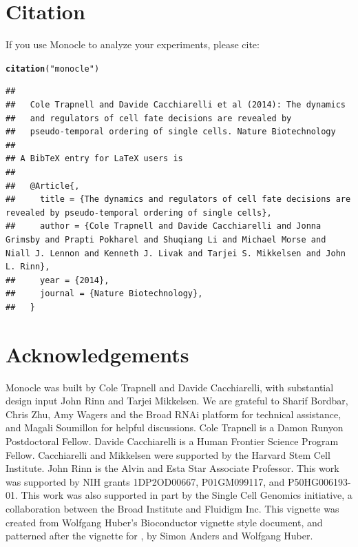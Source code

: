 \documentclass[10pt,oneside]{article}\usepackage[]{graphicx}\usepackage[]{color}
\makeatletter
\newcommand{\hlstr}[1]{\textcolor[rgb]{0.192,0.494,0.8}{#1}}%
\newcommand{\hlstd}[1]{\textcolor[rgb]{0.345,0.345,0.345}{#1}}%
\newcommand{\hlkwd}[1]{\textcolor[rgb]{0.737,0.353,0.396}{\textbf{#1}}}%
\newenvironment{kframe}{%
 \def\at@end@of@kframe{}%
 \ifinner\ifhmode%
  \def\at@end@of@kframe{\end{minipage}}%
  \begin{minipage}{\columnwidth}%
 \fi\fi%
 \def\FrameCommand##1{\hskip\@totalleftmargin \hskip-\fboxsep
 \colorbox{shadecolor}{##1}\hskip-\fboxsep
     \hskip-\linewidth \hskip-\@totalleftmargin \hskip\columnwidth}%
 \MakeFramed {\advance\hsize-\width
   \@totalleftmargin\z@ \linewidth\hsize
   \@setminipage}}%
 {\par\unskip\endMakeFramed%
 \at@end@of@kframe}
\newenvironment{knitrout}{}{} %
\makeatother
\begin{document}
\section{Citation}
If you use Monocle to analyze your experiments, please cite:
\begin{knitrout}
\color{fgcolor}\begin{kframe}
\begin{alltt}
\hlkwd{citation}\hlstd{(}\hlstr{"monocle"}\hlstd{)}
\end{alltt}
\begin{verbatim}
## 
##   Cole Trapnell and Davide Cacchiarelli et al (2014): The dynamics
##   and regulators of cell fate decisions are revealed by
##   pseudo-temporal ordering of single cells. Nature Biotechnology
## 
## A BibTeX entry for LaTeX users is
## 
##   @Article{,
##     title = {The dynamics and regulators of cell fate decisions are revealed by pseudo-temporal ordering of single cells},
##     author = {Cole Trapnell and Davide Cacchiarelli and Jonna Grimsby and Prapti Pokharel and Shuqiang Li and Michael Morse and Niall J. Lennon and Kenneth J. Livak and Tarjei S. Mikkelsen and John L. Rinn},
##     year = {2014},
##     journal = {Nature Biotechnology},
##   }
\end{verbatim}
\end{kframe}
\end{knitrout}


\section{Acknowledgements}

Monocle was built by Cole Trapnell and Davide Cacchiarelli, with substantial design input John Rinn and Tarjei Mikkelsen. We are grateful to Sharif Bordbar, Chris Zhu, Amy Wagers and the Broad RNAi platform for technical assistance, and Magali Soumillon for helpful discussions. Cole Trapnell is a Damon Runyon Postdoctoral Fellow. Davide Cacchiarelli is a Human Frontier Science Program Fellow. Cacchiarelli and Mikkelsen were supported by the Harvard Stem Cell Institute. John Rinn is the Alvin and Esta Star Associate Professor. This work was supported by NIH grants 1DP2OD00667, P01GM099117, and P50HG006193-01. This work was also supported in part by the Single Cell Genomics initiative, a collaboration between the Broad Institute and Fluidigm Inc. This vignette was created from Wolfgang Huber's Bioconductor vignette style document, and patterned after the vignette for , by Simon Anders and Wolfgang Huber.
\end{document}
